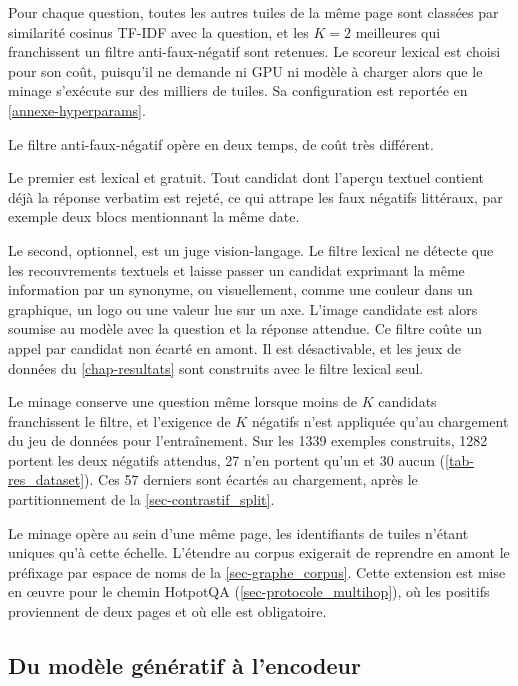 Pour chaque question, toutes les autres tuiles de la même page sont classées par
similarité cosinus TF-IDF avec la question, et les $K = 2$ meilleures qui
franchissent un filtre anti-faux-négatif sont retenues. Le scoreur lexical est
choisi pour son coût, puisqu'il ne demande ni GPU ni modèle à charger alors que
le minage s'exécute sur des milliers de tuiles. Sa configuration est reportée en
\cref{annexe-hyperparams}.
 
Le filtre anti-faux-négatif opère en deux temps, de coût très différent.
 
Le premier est lexical et gratuit. Tout candidat dont l'aperçu textuel
contient déjà la réponse verbatim est rejeté, ce qui attrape les faux négatifs
littéraux, par exemple deux blocs mentionnant la même date.
 
Le second, optionnel, est un juge vision-langage. Le filtre lexical ne
détecte que les recouvrements textuels et laisse passer un candidat exprimant la
même information par un synonyme, ou visuellement, comme une couleur dans un
graphique, un logo ou une valeur lue sur un axe. L'image candidate est alors
soumise au modèle avec la question et la réponse attendue. Ce filtre coûte un
appel par candidat non écarté en amont. Il est désactivable, et les jeux de
données du \cref{chap-resultats} sont construits avec le filtre lexical seul.
 
Le minage conserve une question même lorsque moins de $K$ candidats franchissent
le filtre, et l'exigence de $K$ négatifs n'est appliquée qu'au chargement du jeu
de données pour l'entraînement. Sur les \num{1339} exemples construits,
\num{1282} portent les deux négatifs attendus, \num{27} n'en portent qu'un et
\num{30} aucun (\cref{tab-res_dataset}). Ces \num{57} derniers sont écartés au
chargement, après le partitionnement de la \cref{sec-contrastif_split}.
 
Le minage opère au sein d'une même page, les identifiants de tuiles n'étant
uniques qu'à cette échelle. L'étendre au corpus exigerait de reprendre en amont
le préfixage par espace de noms de la \cref{sec-graphe_corpus}. Cette extension
est mise en œuvre pour le chemin HotpotQA (\cref{sec-protocole_multihop}), où
les positifs proviennent de deux pages et où elle est obligatoire.
 
\subsection{Du modèle génératif à l'encodeur}
\label{sec-contrastif_encodeur}
 
